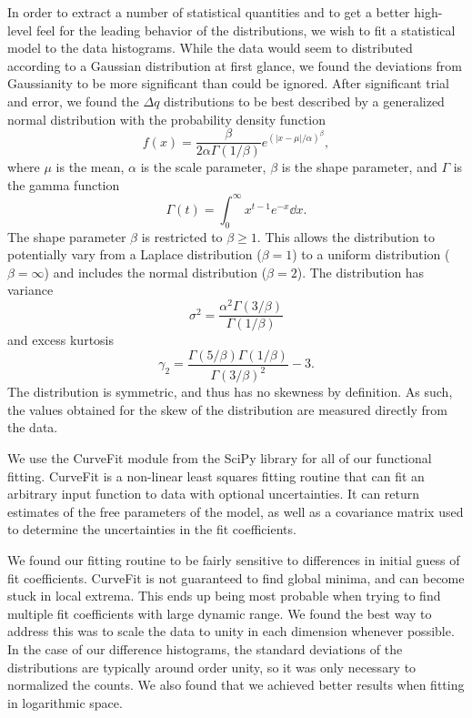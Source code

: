 In order to extract a number of statistical quantities and to get a better high-level feel for the leading behavior of the distributions, we wish to fit a statistical model to the data histograms.  While the data would seem to distributed according to a Gaussian distribution at first glance, we found the deviations from Gaussianity to be more significant than could be ignored.  After significant trial and error, we found the $\Delta q$ distributions to be best described by a generalized normal distribution \citep{doi:10.1080/02664760500079464} with the probability density function
\begin{equation} \label{eq:analysis--methods--generalized_normal}
	f(x) = \frac{ \beta }{2 \alpha \Gamma(1 / \beta)} e^{\left( \left| x - \mu \right| / \alpha \right)^{\beta}},
\end{equation}
where $\mu$ is the mean, $\alpha$ is the scale parameter, $\beta$ is the shape parameter, and $\Gamma$ is the gamma function
\begin{equation} \label{eq:gamma_function}
	\Gamma(t) = \int_{0}^{\infty} x^{t-1} e^{-x} \dd x.
\end{equation}
The shape parameter $\beta$ is restricted to $\beta \geq 1$.  This allows the distribution to potentially vary from a Laplace distribution ($\beta = 1$) to a uniform distribution ($\beta = \infty$) and includes the normal distribution ($\beta = 2$).  The distribution has variance
\begin{equation} \label{eq:variance}
	\sigma^{2} = \frac{ \alpha^{2} \Gamma(3/\beta) }{ \Gamma(1/\beta) }
\end{equation}
and excess kurtosis
\begin{equation} \label{eq:kurtosis}
	\gamma_{2} = \frac{ \Gamma(5/\beta) \Gamma(1/\beta) }{ \Gamma(3/\beta)^{2} } - 3.
\end{equation}
The distribution is symmetric, and thus has no skewness by definition.  As such, the values obtained for the skew of the distribution are measured directly from the data.

We use the CurveFit module from the SciPy library for all of our functional fitting.  CurveFit is a non-linear least squares fitting routine that can fit an arbitrary input function to data with optional uncertainties.  It can return estimates of the free parameters of the model, as well as a covariance matrix used to determine the uncertainties in the fit coefficients.

We found our fitting routine to be fairly sensitive to differences in initial guess of fit coefficients.  CurveFit is not guaranteed to find global minima, and can become stuck in local extrema.  This ends up being most probable when trying to find multiple fit coefficients with large dynamic range.  We found the best way to address this was to scale the data to unity in each dimension whenever possible.  In the case of our difference histograms, the standard deviations of the distributions are typically around order unity, so it was only necessary to normalized the counts.  We also found that we achieved better results when fitting in logarithmic space.

